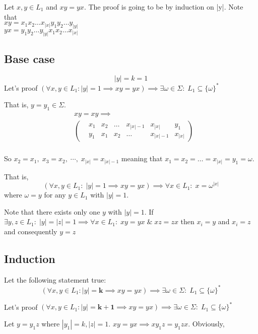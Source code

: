 Let $x,y \in L_1$ and $xy = yx$.
The proof is going to be by induction on |y|. Note that\\
$xy = x_1x_2\dots x_{|x|}y_1y_2 \dots y_{|y|}$ \\ 
$yx = y_1y_2 \dots y_{|y|}x_1x_2\dots x_{|x|}$ 

\subsection*{Base case}
\[|y| = k = 1\]
Let's proof $\left(\forall x, y \in L_1 : |y| = 1 \implies xy = yx\right) 
\implies \exists \omega \in \Sigma :\; L_1 \subseteq \{\omega\}^*$

That is, $y = y_1 \in \Sigma$. 
\begin{align*} 
	& xy = xy \implies \\
	& \begin{pmatrix}
		& x_1 & x_2 & \dots & x_{|x|-1} & x_{|x|} & y_1 \\
		& y_1 & x_1 & x_2 & \dots & x_{|x|-1} & x_{|x|}
	\end{pmatrix} \\
\end{align*}

So $x_2 = x_1,\; x_3 = x_2,\; \cdots ,\; x_{|x|} = x_{|x|-1}$ 
meaning that $x_1 = x_2 = \dots = x_{|x|} = y_1 = \omega$.

That is, 
\[(\forall x, y \in L_1 :\; |y|=1 \implies xy = yx ) \implies \forall x \in L_1 :\; x = \omega ^ {|x|}\]
where $\omega = y$ for any $y \in L_1$ with $|y| = 1$.

Note that there exists only one $y$ with $|y| = 1$. 
If $\exists y,z \in L_1 :\; |y|=|z|=1 \implies \forall x \in L_1 :\; xy=yx \;\&\; xz=zx$ then 
$x_i = y$ and $x_i = z$ and consequently $y = z$

\subsection*{Induction}
Let the following statement true:
\[\left(\forall x, y \in L_1 : |y| = \mathbf{k} \implies xy = yx\right) 
\implies \exists \omega \in \Sigma :\; L_1 \subseteq \{\omega\}^*\]

Let's proof $\left(\forall x, y \in L_1 : |y| = \mathbf{k + 1} \implies xy = yx\right) 
\implies \exists \omega \in \Sigma :\; L_1 \subseteq \{\omega\}^*$

Let $y = y_1 z$ where $|y_1| = k, |z|=1$.
$xy = yx \implies xy_1z = y_1zx$. Obviously, 
